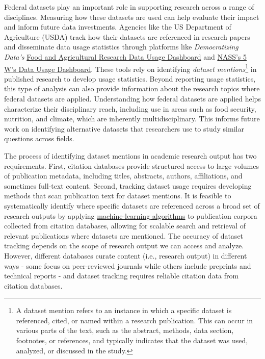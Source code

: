 \documentclass[
  letterpaper,
  DIV=11,
  numbers=noendperiod]{scrartcl}
\begin{document}
Federal datasets play an important role in supporting research across a
range of disciplines. Measuring how these datasets are used can help
evaluate their impact and inform future data investments. Agencies like
the US Department of Agriculture (USDA) track how their datasets are
referenced in research papers and disseminate data usage statistics
through platforms like \emph{Democratizing Data's}
\href{https://democratizingdata.ai/tools/dashboard/food-agricultural-research/}{Food
and Agricultural Research Data Usage Dashboard} and
\href{https://www.nass.usda.gov/Data_Visualization/5W/index.php}{NASS's
5 W's Data Usage Dashboard}. These tools rely on identifying
\emph{dataset mentions}\footnote{A dataset mention refers to an instance
  in which a specific dataset is referenced, cited, or named within a
  research publication. This can occur in various parts of the text,
  such as the abstract, methods, data section, footnotes, or references,
  and typically indicates that the dataset was used, analyzed, or
  discussed in the study.} in published research to develop usage
statistics. Beyond reporting usage statistics, this type of analysis can
also provide information about the research topics where federal
datasets are applied. Understanding how federal datasets are applied
helps characterize their disciplinary reach, including use in areas such
as food security, nutrition, and climate, which are inherently
multidisciplinary. This informs future work on identifying alternative
datasets that researchers use to study similar questions across fields.

The process of identifying dataset mentions in academic research output
has two requirements. First, citation databases provide structured
access to large volumes of publication metadata, including titles,
abstracts, authors, affiliations, and sometimes full-text content.
Second, tracking dataset usage requires developing methods that scan
publication text for dataset mentions. It is feasible to systematically
identify where specific datasets are referenced across a broad set of
research outputs by applying
\href{https://github.com/democratizingdata/democratizingdata-ml-algorithms/tree/main}{machine-learning
algorithms} to publication corpora collected from citation databases,
allowing for scalable search and retrieval of relevant publications
where datasets are mentioned. The accuracy of dataset tracking depends
on the scope of research output we can access and analyze. However,
different databases curate content (i.e., research output) in different
ways - some focus on peer-reviewed journals while others include
preprints and technical reports - and dataset tracking requires reliable
citation data from citation databases.
\end{document}
